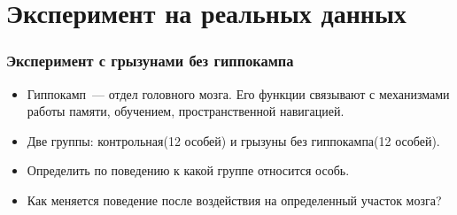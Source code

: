 \documentclass[smaller]{beamer}
\begin{document}
\section{Эксперимент на реальных данных}

\begin{frame}
  \frametitle{Эксперимент с грызунами без гиппокампа}
  \begin{itemize}
   \item Гиппокамп~--- отдел головного мозга. Его функции 
связывают с механизмами работы памяти, обучением, пространственной
навигацией.
   \item Две группы: контрольная(12 особей) и грызуны без гиппокампа(12 особей).
   \item Определить по поведению к какой группе относится особь.
   \item Как меняется поведение после воздействия на определенный участок мозга?
  \end{itemize}
\begin{figure}[H]
\end{figure}
\end{frame}
\end{document}
